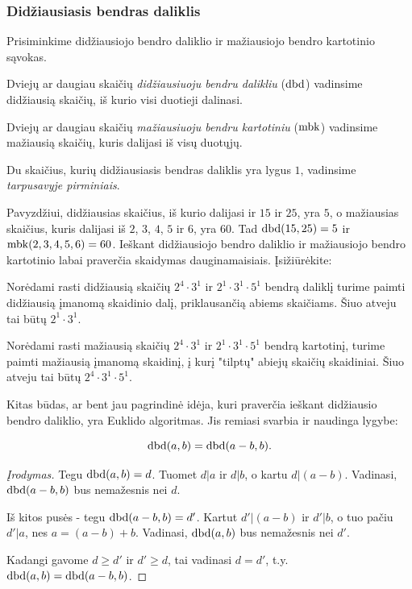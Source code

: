 \subsubsection{Didžiausiasis bendras daliklis}

Prisiminkime didžiausiojo bendro daliklio ir mažiausiojo bendro kartotinio
sąvokas.

\begin{api}Dviejų ar daugiau skaičių \emph{didžiausiuoju bendru dalikliu} ($\operatorname{dbd}$)
  vadinsime didžiausią skaičių, iš kurio visi duotieji dalinasi.  
\end{api}

\begin{api} Dviejų ar daugiau skaičių \emph{mažiausiuoju bendru kartotiniu} ($\operatorname{mbk}$)
  vadinsime mažiausią skaičių, kuris dalijasi iš visų duotųjų.  
\end{api}

\begin{api}
  Du skaičius, kurių didžiausiasis bendras daliklis yra lygus $1$, vadinsime
  \emph{tarpusavyje pirminiais}.
\end{api}

Pavyzdžiui, didžiausias skaičius, iš kurio dalijasi ir $15$ ir $25$, yra $5$,
o mažiausias skaičius, kuris dalijasi iš $2$, $3$, $4$, $5$ ir $6$, yra
$60$. Tad $\operatorname{dbd}(15,25)=5$ ir $\operatorname{mbk}(2,3,4,5,6)=60$. Ieškant didžiausiojo
bendro daliklio ir mažiausiojo bendro kartotinio labai praverčia skaidymas
dauginamaisiais. Įsižiūrėkite:

Norėdami rasti didžiausią skaičių $2^4\cdot3^1$ ir $2^1\cdot3^1\cdot5^1$
bendrą daliklį turime paimti didžiausią įmanomą skaidinio dalį,
priklausančią abiems skaičiams. Šiuo atveju tai būtų $2^1\cdot3^1$.

Norėdami rasti mažiausią skaičių $2^4\cdot3^1$ ir $2^1\cdot3^1\cdot5^1$
bendrą kartotinį, turime paimti mažiausią įmanomą skaidinį, į kurį "tilptų"
abiejų skaičių skaidiniai. Šiuo atveju tai būtų $2^4 \cdot 3^1 \cdot 5^1$.

Kitas būdas, ar bent jau pagrindinė idėja, kuri praverčia ieškant
didžiausio bendro daliklio, yra Euklido algoritmas. Jis remiasi svarbia ir
naudinga lygybe:
\begin{teig}
  $$\operatorname{dbd}(a,b) = \operatorname{dbd}(a-b,b).$$
\end{teig}

\begin{proof}[Įrodymas]
Tegu $\operatorname{dbd}(a,b)=d$. Tuomet $d|a$ ir $d|b$, o kartu $d|(a-b)$. Vadinasi,
$\operatorname{dbd}(a-b,b)$ bus nemažesnis nei $d$.  

Iš kitos pusės - tegu $\operatorname{dbd}(a-b,b) = d'$. Kartut $d'|(a-b)$ ir $d'|b$, o
tuo pačiu $d'|a$, nes $a = (a-b) + b$.  Vadinasi, $\operatorname{dbd}(a,b)$ bus nemažesnis
nei $d'$. 

Kadangi gavome $d\geq d'$ ir $d' \geq d$, tai vadinasi $d=d'$, t.y.
$\operatorname{dbd}(a,b) = \operatorname{dbd}(a-b,b)$.
\end{proof}

